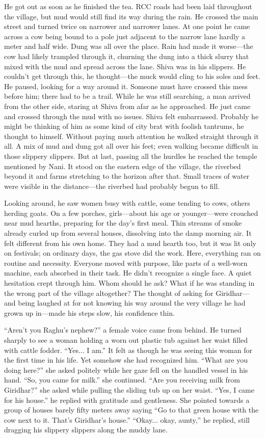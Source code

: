 He got out as soon as he finished the tea. RCC roads had been laid throughout the village, but mud would still find its way during the rain. He crossed the main street and turned twice on narrower and narrower lanes. At one point he came across a cow being bound to a pole just adjacent to the narrow lane hardly a meter and half wide. Dung was all over the place. Rain had made it worse—the cow had likely trampled through it, churning the dung into a thick slurry that mixed with the mud and spread across the lane. Shiva was in his slippers. He couldn't get through this, he thought—the muck would cling to his soles and feet. He paused, looking for a way around it. Someone must have crossed this mess before him; there had to be a trail. While he was still searching, a man arrived from the other side, staring at Shiva from afar as he approached. He just came and crossed through the mud with no issues. Shiva felt embarrassed. Probably he might be thinking of him as some kind of city brat with foolish tantrums, he thought to himself. Without paying much attention he walked straight through it all. A mix of mud and dung got all over his feet; even walking became difficult in those slippery slippers. But at last, passing all the hurdles he reached the temple mentioned by Nani. It stood on the eastern edge of the village, the riverbed beyond it and farms stretching to the horizon after that. Small traces of water were visible in the distance—the riverbed had probably begun to fill.

Looking around, he saw women busy with cattle, some tending to cows, others herding goats. On a few porches, girls—about his age or younger—were crouched near mud hearths, preparing for the day's first meal. Thin streams of smoke already curled up from several houses, dissolving into the damp morning air. It felt different from his own home. They had a mud hearth too, but it was lit only on festivals; on ordinary days, the gas stove did the work. Here, everything ran on routine and necessity. Everyone moved with purpose, like parts of a well-worn machine, each absorbed in their task. He didn't recognize a single face. A quiet hesitation crept through him. Whom should he ask? What if he was standing in the wrong part of the village altogether? The thought of asking for Giridhar—and being laughed at for not knowing his way around the very village he had grown up in—made his steps slow, his confidence thin.

``Aren't you Raghu's nephew?'' a female voice came from behind. He turned sharply to see a woman holding a worn out plastic tub against her waist filled with cattle fodder. ``Yes... I am.'' It felt as though he was seeing this woman for the first time in his life. Yet somehow she had recognized him. ``What are you doing here?'' she asked politely while her gaze fell on the handled vessel in his hand. ``So, you came for milk.'' she continued. ``Are you receiving milk from Giridhar?'' she asked while pulling the sliding tub up on her waist. ``Yes, I came for his house.'' he replied with gratitude and gentleness. She pointed towards a group of houses barely fifty meters away saying ``Go to that green house with the cow next to it. That's Giridhar's house.'' ``Okay... okay, aunty,'' he replied, still dragging his slippery slippers along the muddy lane.

